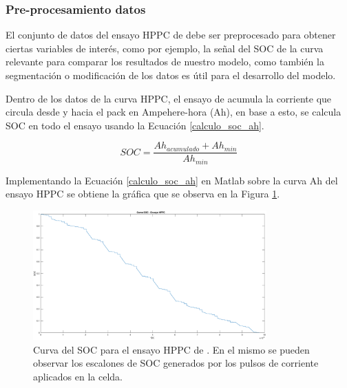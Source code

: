 \documentclass[10pt, a4paper]{article}
\newcounter{subsubsubsection}[subsubsection]
\begin{document}

\subsubsection{Pre-procesamiento datos}\label{data_preprocessing}

El conjunto de datos del ensayo \acrshort{HPPC} de \cite{Kollmeyer2018} debe ser
preprocesado para obtener ciertas variables de inter\'es, como por ejemplo, la
señal del \acrshort{SOC} de la curva relevante para comparar los resultados de
nuestro modelo, como tambi\'en la segmentaci\'on o modificaci\'on de los datos
es \'util para el desarrollo del modelo.


Dentro de los datos de la curva \acrshort{HPPC}, el ensayo de
\cite{Kollmeyer2018} acumula la corriente que circula desde y hacia el pack en
Ampehere-hora (Ah), en base a esto, se calcula \acrshort{SOC} en todo el ensayo
usando la Ecuaci\'on \ref{calculo_soc_ah}.

\begin{equation}
    SOC = \frac{Ah_{acumulado} + Ah_{min}}{Ah_{min}} \label{calculo_soc_ah}
\end{equation}

Implementando la Ecuaci\'on \ref{calculo_soc_ah} en Matlab sobre la curva Ah del
ensayo \acrshort{HPPC} se obtiene la gr\'afica que se observa en la Figura
\ref{soc_hppc_data}.

\begin{figure}[h!]
    \begin{center}
        \includegraphics[width=0.8\textwidth]{soc_hppc_data.eps}
        \caption{Curva del \acrshort{SOC} para el ensayo HPPC de
        \cite{Kollmeyer2018}. En el mismo se pueden observar los escalones de
        \acrshort{SOC} generados por los pulsos de corriente aplicados en la
        celda.}
        \label{soc_hppc_data}
    \end{center}
\end{figure}
\FloatBarrier
\end{document}
